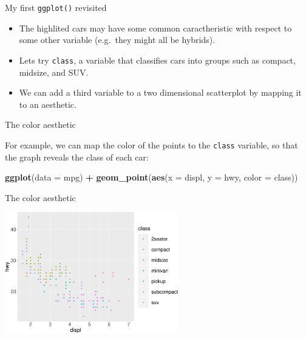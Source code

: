 \documentclass[ignorenonframetext,]{beamer}
\newenvironment{Shaded}{\begin{snugshade}}{\end{snugshade}}
\newcommand{\DataTypeTok}[1]{\textcolor[rgb]{0.13,0.29,0.53}{#1}}
\newcommand{\KeywordTok}[1]{\textcolor[rgb]{0.13,0.29,0.53}{\textbf{#1}}}
\newcommand{\NormalTok}[1]{#1}
\newcommand{\OperatorTok}[1]{\textcolor[rgb]{0.81,0.36,0.00}{\textbf{#1}}}
\newcommand{\StringTok}[1]{\textcolor[rgb]{0.31,0.60,0.02}{#1}}
\begin{document}
\begin{frame}[fragile]{My first \texttt{ggplot()} revisited}
\protect\hypertarget{my-first-ggplot-revisited-1}{}

\begin{itemize}
\item
  The highlited cars may have some common caractheristic with respect to
  some other variable (e.g.~they might all be hybrids).
\item
  Lets try \texttt{class}, a variable that classifies cars into groups
  such as compact, midsize, and SUV.
\item
  We can add a third variable to a two dimensional scatterplot by
  mapping it to an aesthetic.
\end{itemize}

\end{frame}

\begin{frame}[fragile]{The color aesthetic}
\protect\hypertarget{the-color-aesthetic}{}

For example, we can map the color of the points to the \texttt{class}
variable, so that the graph reveals the class of each car:

\begin{Shaded}
\begin{Highlighting}[]
\KeywordTok{ggplot}\NormalTok{(}\DataTypeTok{data =}\NormalTok{ mpg) }\OperatorTok{+}
\StringTok{  }\KeywordTok{geom_point}\NormalTok{(}\KeywordTok{aes}\NormalTok{(}\DataTypeTok{x =}\NormalTok{ displ, }\DataTypeTok{y =}\NormalTok{ hwy, }\DataTypeTok{color =}\NormalTok{ class))}
\end{Highlighting}
\end{Shaded}

\end{frame}

\begin{frame}{The color aesthetic}
\protect\hypertarget{the-color-aesthetic-1}{}

\begin{center}\includegraphics[height=200px]{data-visualization_files/figure-beamer/unnamed-chunk-8-1} \end{center}

\end{frame}
\end{document}
